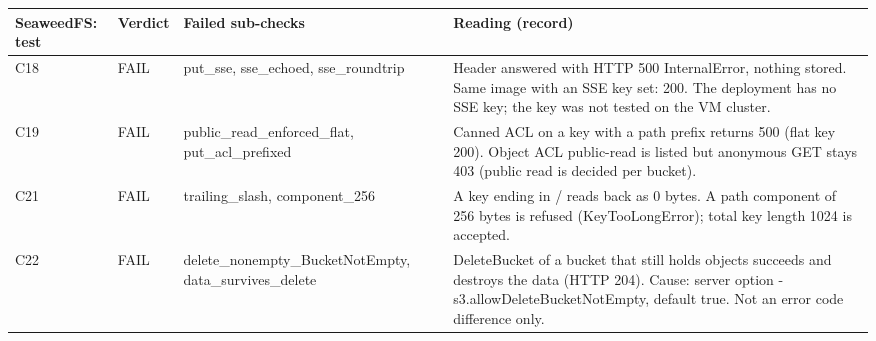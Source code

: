 \begin{tabular}{@{}lp{2.0cm}p{3.6cm}p{7.0cm}@{}}
\toprule
SeaweedFS: test & Verdict & Failed sub-checks & Reading (record) \\
\midrule
C18 & FAIL & put\_sse, sse\_echoed, sse\_roundtrip & Header answered with HTTP 500 InternalError, nothing stored. Same image with an SSE key set: 200. The deployment has no SSE key; the key was not tested on the VM cluster. \\
C19 & FAIL & public\_read\_enforced\_flat, put\_acl\_prefixed & Canned ACL on a key with a path prefix returns 500 (flat key 200). Object ACL public-read is listed but anonymous GET stays 403 (public read is decided per bucket). \\
C21 & FAIL & trailing\_slash, component\_256 & A key ending in / reads back as 0 bytes. A path component of 256 bytes is refused (KeyTooLongError); total key length 1024 is accepted. \\
C22 & FAIL & delete\_nonempty\_BucketNotEmpty, data\_survives\_delete & DeleteBucket of a bucket that still holds objects succeeds and destroys the data (HTTP 204). Cause: server option -s3.allowDeleteBucketNotEmpty, default true. Not an error code difference only. \\
\bottomrule
\end{tabular}
